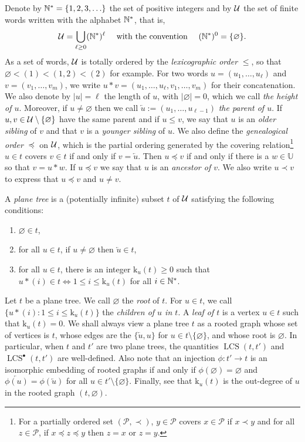 \documentclass[11pt,reqno]{amsart}
\newcommand{\rk}{\mathrm{k}}
\newcommand{\LCS}{\operatorname{LCS}}
\renewcommand{\emptyset}{\varnothing}
\begin{document}
Denote by $\mathbb{N}^*=\{1,2,3,\ldots\}$ the set of positive integers and by $\mathcal{U}$ the set of finite words written with the alphabet $\mathbb{N}^*$, that is,
\[\mathcal{U}=\bigcup_{\ell\geq 0}(\mathbb{N}^*)^\ell\quad\text{ with the convention }\quad(\mathbb{N}^*)^0=\{\varnothing\}.\]
As a set of words, $\mathcal{U}$ is totally ordered by the \emph{lexicographic order} $\leq$, so that $\varnothing<(1)<(1,2)<(2)$ for example. For two words $u=(u_1,\ldots,u_\ell)$ and $v=(v_1,\ldots,v_m)$, we write $u*v=(u_1,\ldots,u_\ell,v_1,\ldots,v_m)$ for their concatenation. We also denote by $|u|=\ell$ the length of $u$, with $|\varnothing|=0$, which we call \emph{the height of $u$}. Moreover, if $u\neq\varnothing$ then we call $\overleftarrow{u}:=(u_1,\ldots,u_{\ell-1})$ \emph{the parent of $u$}. If $u,v\in \mathcal{U}\setminus\{\varnothing\}$ have the same parent and if $u\leq v$, we say that $u$ is an \emph{older sibling} of $v$ and that $v$ is a \emph{younger sibling} of $u$.  We also define the \emph{genealogical order} $\preceq$ on $\mathcal{U}$, which is the partial ordering generated by the covering relation\footnote{For a partially ordered set $(\mathcal{P},\prec)$, $y\in \mathcal{P}$ covers $x\in \mathcal{P}$ if $x\prec y$ and for all $z\in \mathcal{P}$, if $x\preceq z \preceq y$ then $z=x$ or $z=y$.} $u\in t$ covers $v\in t$ if and only if $v=\overleftarrow{u}$. Then $u\preceq v$ if and only if there is a $w\in \mathbb{U}$ so that $v=u*w$. If $u\preceq v$ we say that $u$ is an \emph{ancestor of $v$}. We also write $u \prec v$ to express that $u \preceq v$ and $u \ne v$. 

\begin{defn}
\label{def:tree}
A \emph{plane tree} is a (potentially infinite) subset $t$ of $\mathcal{U}$ satisfying the following conditions:
\begin{enumerate}
    \item[(a)] $\varnothing\in t$,
    \item[(b)] for all $u\in t$, if $u\neq\varnothing$ then $\overleftarrow{u}\in t$,
    \item[(c)] for all $u\in t$, there is an integer $\rk_u(t)\geq 0$ such that $u * (i)\in t \Leftrightarrow 1\leq i\leq  \rk_u(t)$ for all $i \in \mathbb{N}^*$.
\end{enumerate}
\end{defn}

Let $t$ be a plane tree. We call $\varnothing$ the \emph{root} of $t$. For $u\in t$, we call $\{u\! *\! (i) : 1\leq i \leq \rk_u(t)\}$ the \emph{children of $u$ in $t$}. A \emph{leaf of $t$} is a vertex $u\in t$ such that $\rk_u(t)=0$. We shall always view a plane tree $t$ as a rooted graph whose set of vertices is $t$, whose edges are the $\{\overleftarrow{u},u\}$ for $u\in t\setminus\{\varnothing\}$, and whose root is $\varnothing$. In particular, when $t$ and $t'$ are two plane trees, the quantities $\LCS(t,t')$ and $\LCS^\bullet(t,t')$ are well-defined. Also note that an injection $\phi:t'\to t$ is an isomorphic embedding of rooted graphs if and only if $\phi(\emptyset)=\emptyset$ and $\overleftarrow{\phi(u)}=\phi(\overleftarrow{u})$ for all $u\in t'\setminus\{\varnothing\}$. Finally, see that $\rk_u(t)$ is the out-degree of $u$ in the rooted graph $(t,\varnothing)$.
\smallskip
\end{document}
